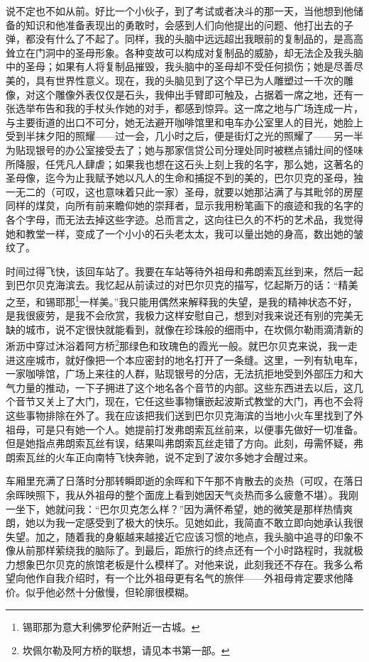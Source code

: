 \par 说不定也不如从前。好比一个小伙子，到了考试或者决斗的那一天，当他想到他储备的知识和他准备表现出的勇敢时，会感到人们向他提出的问题、他打出去的子弹，都没有什么了不起了。同样，我的头脑中远远超出我眼前的复制品的，是高高耸立在门洞中的圣母形象。各种变故可以构成对复制品的威胁，却无法企及我头脑中的圣母；如果有人将复制品摧毁，我头脑中的圣母却不受任何损伤；她是尽善尽美的，具有世界性意义。现在，我的头脑见到了这个早已为人雕塑过一千次的雕像，对这个雕像外表仅仅是石头，我伸出手臂即可触及，占据着一席之地，还有一张选举布告和我的手杖头作她的对手，都感到惊异。这一席之地与广场连成一片，与主要街道的出口不可分，她无法避开咖啡馆里和电车办公室里人的目光，她脸上受到半抹夕阳的照耀——过一会，几小时之后，便是街灯之光的照耀了——另一半为贴现银号的办公室接受去了；她与那家信贷公司分理处同时被糕点铺灶间的怪味所降服，任凭凡人肆虐；如果我也想在这石头上刻上我的名字，那么她，这著名的圣母像，迄今为止我赋予她以凡人的生命和捕捉不到的美的，巴尔贝克的圣母，独一无二的（可叹，这也意味着只此一家）圣母，就要以她那沾满了与其毗邻的房屋同样的煤炱，向所有前来瞻仰她的崇拜者，显示我用粉笔画下的痕迹和我的名字的各个字母，而无法去掉这些字迹。总而言之，这向往已久的不朽的艺术品，我觉得她和教堂一样，变成了一个小小的石头老太太，我可以量出她的身高，数出她的皱纹了。
\par 时间过得飞快，该回车站了。我要在车站等待外祖母和弗朗索瓦丝到来，然后一起到巴尔贝克海滨去。我忆起从前读过的对巴尔贝克的描写，忆起斯万的话：“精美之至，和锡耶那\footnote{锡耶那为意大利佛罗伦萨附近一古城。}一样美。”我只能用偶然来解释我的失望，是我的精神状态不好，是我很疲劳，是我不会欣赏，我极力这样安慰自己，想到对我来说还有别的完美无缺的城市，说不定很快就能看到，就像在珍珠般的细雨中，在坎佩尔勒雨滴清新的淅沥中穿过沐浴着阿方桥\footnote{坎佩尔勒及阿方桥的联想，请见本书第一部。}那绿色和玫瑰色的霞光一般。就巴尔贝克来说，我一走进这座城市，就好像把一个本应密封的地名打开了一条缝。这里，一列有轨电车，一家咖啡馆，广场上来往的人群，贴现银号的分店，无法抗拒地受到外部压力和大气力量的推动，一下子拥进了这个地名各个音节的内部。这些东西进去以后，这几个音节又关上了大门，现在，它任这些事物镶嵌起波斯式教堂的大门，再也不会将这些事物排除在外了。我在应该把我们送到巴尔贝克海滨的当地小火车里找到了外祖母，可是只有她一个人。她提前打发弗朗索瓦丝前来，以便事先做好一切准备。但是她指点弗朗索瓦丝有误，结果叫弗朗索瓦丝走错了方向。此刻，毋需怀疑，弗朗索瓦丝的火车正向南特飞快奔驰，说不定到了波尔多她才会醒过来。
\par 车厢里充满了日落时分那转瞬即逝的余晖和下午那不肯散去的炎热（可叹，在落日余晖映照下，我从外祖母的整个面庞上看到她因天气炎热而多么疲惫不堪）。我刚一坐下，她就问我：“巴尔贝克怎么样？”因为满怀希望，她的微笑是那样热情爽朗，她以为我一定感受到了极大的快乐。见她如此，我简直不敢立即向她承认我很失望。加之，随着我的身躯越来越接近它应该习惯的地点，我头脑中追寻的印象不像从前那样萦绕我的脑际了。到最后，距旅行的终点还有一个小时路程时，我就极力想象巴尔贝克的旅馆老板是什么模样了。对他来说，此刻我还不存在。我多么希望向他作自我介绍时，有一个比外祖母更有名气的旅伴——外祖母肯定要求他降价。似乎他必然十分傲慢，但轮廓很模糊。
